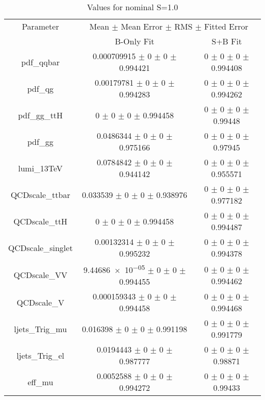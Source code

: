 \begin{table}
\centering
\caption{Values for nominal S=1.0}
\begin{tabular}{ccc}
\toprule
Parameter 	& \multicolumn{2}{c}{Mean $\pm$ Mean Error $\pm$ RMS $\pm$ Fitted Error}\\
 	& B-Only Fit & S+B Fit\\
\midrule
pdf\_qqbar 	& \num{0.000709915} $\pm$ \num{0} $\pm$ \num{0} $\pm$ \num{0.994421} 	& \num{0} $\pm$ \num{0} $\pm$ \num{0} $\pm$ \num{0.994408}\\
pdf\_qg 	& \num{0.00179781} $\pm$ \num{0} $\pm$ \num{0} $\pm$ \num{0.994283} 	& \num{0} $\pm$ \num{0} $\pm$ \num{0} $\pm$ \num{0.994262}\\
pdf\_gg\_ttH 	& \num{0} $\pm$ \num{0} $\pm$ \num{0} $\pm$ \num{0.994458} 	& \num{0} $\pm$ \num{0} $\pm$ \num{0} $\pm$ \num{0.99448}\\
pdf\_gg 	& \num{0.0486344} $\pm$ \num{0} $\pm$ \num{0} $\pm$ \num{0.975166} 	& \num{0} $\pm$ \num{0} $\pm$ \num{0} $\pm$ \num{0.97945}\\
lumi\_13TeV 	& \num{0.0784842} $\pm$ \num{0} $\pm$ \num{0} $\pm$ \num{0.944142} 	& \num{0} $\pm$ \num{0} $\pm$ \num{0} $\pm$ \num{0.955571}\\
QCDscale\_ttbar 	& \num{0.033539} $\pm$ \num{0} $\pm$ \num{0} $\pm$ \num{0.938976} 	& \num{0} $\pm$ \num{0} $\pm$ \num{0} $\pm$ \num{0.977182}\\
QCDscale\_ttH 	& \num{0} $\pm$ \num{0} $\pm$ \num{0} $\pm$ \num{0.994458} 	& \num{0} $\pm$ \num{0} $\pm$ \num{0} $\pm$ \num{0.994487}\\
QCDscale\_singlet 	& \num{0.00132314} $\pm$ \num{0} $\pm$ \num{0} $\pm$ \num{0.995232} 	& \num{0} $\pm$ \num{0} $\pm$ \num{0} $\pm$ \num{0.994378}\\
QCDscale\_VV 	& \num{9.44686e-05} $\pm$ \num{0} $\pm$ \num{0} $\pm$ \num{0.994455} 	& \num{0} $\pm$ \num{0} $\pm$ \num{0} $\pm$ \num{0.994462}\\
QCDscale\_V 	& \num{0.000159343} $\pm$ \num{0} $\pm$ \num{0} $\pm$ \num{0.994458} 	& \num{0} $\pm$ \num{0} $\pm$ \num{0} $\pm$ \num{0.994468}\\
ljets\_Trig\_mu 	& \num{0.016398} $\pm$ \num{0} $\pm$ \num{0} $\pm$ \num{0.991198} 	& \num{0} $\pm$ \num{0} $\pm$ \num{0} $\pm$ \num{0.991779}\\
ljets\_Trig\_el 	& \num{0.0194443} $\pm$ \num{0} $\pm$ \num{0} $\pm$ \num{0.987777} 	& \num{0} $\pm$ \num{0} $\pm$ \num{0} $\pm$ \num{0.98871}\\
eff\_mu 	& \num{0.0052588} $\pm$ \num{0} $\pm$ \num{0} $\pm$ \num{0.994272} 	& \num{0} $\pm$ \num{0} $\pm$ \num{0} $\pm$ \num{0.99433}\\

\end{tabular}
\end{table}
